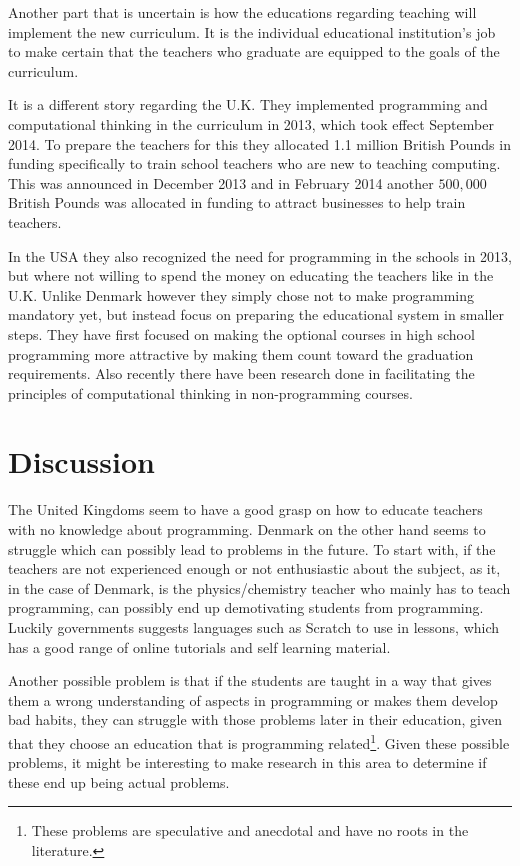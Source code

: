 Another part that is uncertain is how the educations regarding teaching will implement the new curriculum. It is the individual educational institution's job to make certain that the teachers who graduate are equipped to the goals of the curriculum\cite{dk_programming_article}. 

It is a different story regarding the U.K. They implemented programming and computational thinking in the curriculum in 2013, which took effect September 2014\cite{bbc_technology}. To prepare the teachers for this they allocated 1.1 million British Pounds in funding specifically to train school teachers who are new to teaching computing\cite{uk_computing}. This was announced in December 2013 and in February 2014 another $500,000$ British Pounds was allocated in funding to attract businesses to help train teachers\cite{theguardian}.

In the USA they also recognized the need for programming in the schools in 2013\cite{Obama}, but where not willing to spend the money on educating the teachers like in the U.K.
Unlike Denmark however they simply chose not to make programming mandatory yet, but instead focus on preparing the educational system in smaller steps.
They have first focused on making the optional courses in high school programming more attractive by making them count toward the graduation requirements\cite{Code_credit}.
Also recently there have been research done in facilitating the principles of computational thinking in non-programming courses\cite{comp_thinking}.

\section{Discussion}
The United Kingdoms seem to have a good grasp on how to educate teachers with no knowledge about programming. Denmark on the other hand seems to struggle which can possibly lead to problems in the future. To start with, if the teachers are not experienced enough or not enthusiastic about the subject, as it, in the case of Denmark, is the physics/chemistry teacher who mainly has to teach programming, can possibly end up demotivating students from programming. Luckily governments suggests languages such as Scratch to use in lessons, which has a good range of online tutorials and self learning material.

Another possible problem is that if the students are taught in a way that gives them a wrong understanding of aspects in programming or makes them develop bad habits, they can struggle with those problems later in their education, given that they choose an education that is programming related\footnote{These problems are speculative and anecdotal and have no roots in the literature.}. Given these possible problems, it might be interesting to make research in this area to determine if these end up being actual problems.

